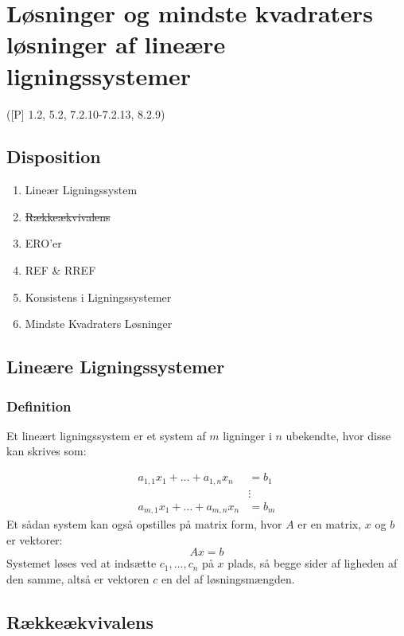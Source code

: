 \newpage
\chapter{Løsninger og mindste kvadraters løsninger af lineære ligningssystemer}
([P] 1.2, 5.2, 7.2.10-7.2.13, 8.2.9)

\section*{Disposition}
\begin{enumerate}
	\item Lineær Ligningssystem
	\item \sout{Rækkeækvivalens}
	\item ERO'er
	\item REF \& RREF
	\item Konsistens i Ligningssystemer
	\item Mindste Kvadraters Løsninger
\end{enumerate}

\section{Lineære Ligningssystemer}


\subsection{Definition}
Et lineært ligningssystem er et system af $m$ ligninger i $n$ ubekendte, hvor 
disse kan skrives som:

\begin{align*}
	a_{1,1}x_1 + \dots + a_{1,n}x_n & = b_1\\
									& \vdots \\
	a_{m,1}x_1 + \dots + a_{m,n}x_n & = b_m
\end{align*}
Et sådan system kan også opstilles på matrix form, hvor $A$ er en matrix, $x$
og $b$ er vektorer:
\[
	Ax = b
\]
Systemet løses ved at indsætte $c_1, \dots, c_n$ på $x$ plads, så begge sider
af ligheden af den samme, altså er vektoren $c$ en del af løsningsmængden.

\section{Rækkeækvivalens}

